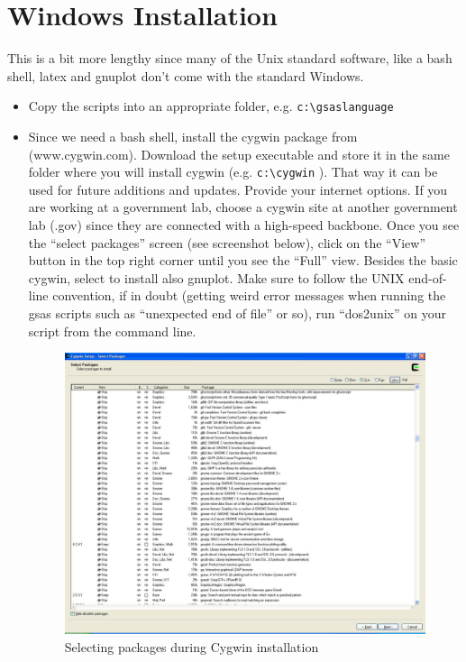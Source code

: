 \section{Windows Installation}

This is a bit more lengthy since many of the Unix standard software, like a bash shell, latex and gnuplot don't come with the standard Windows.
\begin{itemize}
\item Copy the scripts into an appropriate folder, e.g. \texttt{c:\textbackslash gsaslanguage} 
\item Since we need a bash shell, install the cygwin package from (www.cygwin.com).  Download the setup executable and store it in the same folder where you will install cygwin (e.g. \texttt{c:\textbackslash cygwin} ). That way it can be used for future additions and updates. Provide your internet options. If you are working at a government lab, choose a cygwin site at another government lab (.gov) since they are connected with a high-speed backbone. Once you see the ``select packages'' screen (see screenshot below), click on the ``View'' button in the top right corner until you see the ``Full'' view. Besides the basic cygwin, select to install also gnuplot.  Make sure to follow the UNIX end-of-line convention, if in doubt (getting weird error messages when running the gsas scripts such as ``unexpected end of file'' or so), run ``dos2unix'' on your script from the command line.
\begin{figure}[h]
\centering
\includegraphics[width=12cm]{Screenshot1.pdf}
\caption{Selecting packages during Cygwin installation}
\label{fig:Screenshot1}
\end{figure}


\end{itemize}
